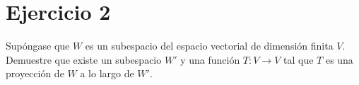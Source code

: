 \section*{Ejercicio 2}

Supóngase que $W$ es un subespacio del espacio vectorial de 
dimensión finita $V$. Demuestre que existe un subespacio $W'$ y
una función $T: V \rightarrow V$ tal que $T$ es una proyección de $W$
a lo largo de $W'$.